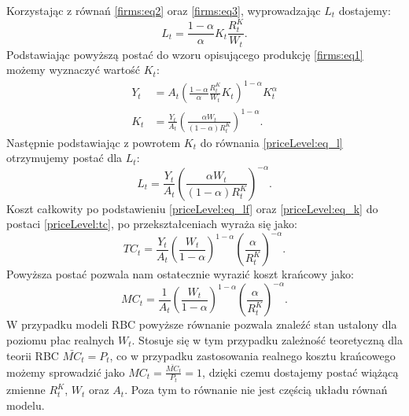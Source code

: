 Korzystając z równań \eqref{firms:eq2} oraz \eqref{firms:eq3}, wyprowadzając $L_t$ dostajemy:
\begin{equation}
    L_t = \frac{1-\alpha}{\alpha}K_t \frac{R^K_t}{W_t} \label{priceLevel:eq_l}.
\end{equation}
Podstawiając powyższą postać do wzoru opisującego produkcję \eqref{firms:eq1} możemy wyznaczyć wartość $K_t$:
\begin{align}
    Y_t &= A_t\left(\frac{1-\alpha}{\alpha}\frac{R^K_t}{W_t}K_t \right)^{1-\alpha}K_t^\alpha \\
    K_t &= \frac{Y_t}{A_t} \left( \frac{\alpha W_t}{(1-\alpha)R^K_t}\right)^{1-\alpha} \label{priceLevel:eq_k}.
\end{align}
Następnie podstawiając z powrotem $K_t$ do równania \eqref{priceLevel:eq_l} otrzymujemy postać dla $L_t$:
\begin{equation}
    L_t = \frac{Y_t}{A_t} \left( \frac{\alpha W_t}{(1-\alpha)R^K_t}\right)^{-\alpha}\label{priceLevel:eq_lf}.
\end{equation}
Koszt całkowity po podstawieniu \eqref{priceLevel:eq_lf} oraz \eqref{priceLevel:eq_k} do postaci \eqref{priceLevel:tc}, po przekształceniach wyraża się jako:
\begin{equation}
    TC_t = \frac{Y_t}{A_t} \left( \frac{W_t}{1-\alpha} \right)^{1-\alpha} \left( \frac{\alpha}{R^K_t} \right)^{-\alpha}.
\end{equation}
Powyższa postać pozwala nam ostatecznie wyrazić koszt krańcowy jako:
\begin{equation}
    MC_t = \frac{1}{A_t} \left( \frac{W_t}{1-\alpha} \right)^{1-\alpha} \left( \frac{\alpha}{R^K_t} \right)^{-\alpha}.
\end{equation}
W przypadku modeli RBC powyższe równanie pozwala znaleźć stan ustalony dla poziomu płac realnych $W_t$. Stosuje się w tym przypadku zależność teoretyczną dla teorii RBC $\bar{MC}_t = P_t$, co w przypadku zastosowania realnego kosztu krańcowego możemy sprowadzić jako $MC_t = \frac{\bar{MC}_t}{P_t} = 1$, dzięki czemu dostajemy postać wiążącą zmienne $R^K_t$, $W_t$ oraz $A_t$. Poza tym to równanie nie jest częścią układu równań modelu.



